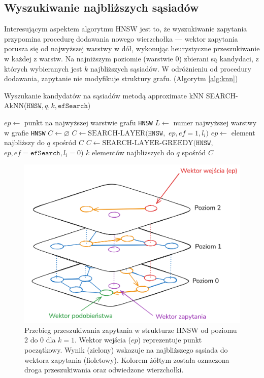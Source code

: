 \documentclass[twocolumn]{article}
\begin{document}
\subsection{Wyszukiwanie najbliższych sąsiadów}
Interesującym aspektem algorytmu HNSW jest to, że wyszukiwanie zapytania przypomina procedurę dodawania nowego wierzchołka — wektor zapytania porusza się od najwyższej warstwy w dół, wykonując heurystyczne przeszukiwanie w każdej z warstw. Na najniższym poziomie (warstwie 0) zbierani są kandydaci, z których wybieranych jest $k$ najbliższych sąsiadów. W odróżnieniu od procedury dodawania, zapytanie nie modyfikuje struktury grafu. (Algorytm \ref{alg:knn})

\begin{algorithm}[H]
\caption{Wyszukanie kandydatów na sąsiadów metodą approximate kNN \newline
SEARCH-AkNN($\texttt{HNSW}, q, k, \texttt{efSearch}$)
}
\label{alg:knn}
\begin{algorithmic}[1]
\STATE $ep \leftarrow$ punkt na najwyższej warstwie grafu \texttt{HNSW}
\STATE $L \leftarrow$ numer najwyższej warstwy w grafie \texttt{HNSW}
\STATE $C \leftarrow \varnothing$ 
\STATE $C \leftarrow \text{SEARCH-LAYER}(\texttt{HNSW},$ \newline $ep, ef = 1, l_i)$
\STATE $ep \leftarrow$ element najbliższy do $q$ spośród $C$
\ENDFOR
\STATE $C \leftarrow \text{SEARCH-LAYER-GREEDY}(\texttt{HNSW},$ \newline $ep, ef = \texttt{efSearch}, l_i =0 )$
\RETURN $k$ elementów najbliższych do $q$ spośród $C$ 
\end{algorithmic}
\end{algorithm}

\begin{figure}[H]
    \centering
    \includegraphics[width=1\linewidth]{Figure_3.png}
    \caption{Przebieg przeszukiwania zapytania w strukturze HNSW od poziomu 2 do 0 dla $k = 1$. Wektor wejścia ($ep$) reprezentuje punkt początkowy. Wynik (zielony) wskazuje na najbliższego sąsiada do wektora zapytania (fioletowy). Kolorem żółtym została oznaczona droga przeszukiwania oraz odwiedzone wierzchołki.}
    \label{fig:3}
\end{figure}
\end{document}
